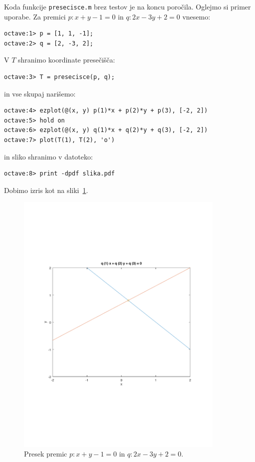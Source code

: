 \documentclass[A4]{article}
\begin{document}
Koda funkcije {\tt presecisce.m} brez testov je na koncu poročila.
Oglejmo si primer uporabe. Za premici $p : x + y - 1 = 0$ in $q : 2x - 3y + 2 = 0$ vnesemo:
\begin{lstlisting}
octave:1> p = [1, 1, -1];
octave:2> q = [2, -3, 2];
\end{lstlisting}
V $T$ shranimo koordinate presečišča:
\begin{lstlisting}
octave:3> T = presecisce(p, q);
\end{lstlisting}
in vse skupaj narišemo:
\begin{lstlisting}
octave:4> ezplot(@(x, y) p(1)*x + p(2)*y + p(3), [-2, 2])
octave:5> hold on 
octave:6> ezplot(@(x, y) q(1)*x + q(2)*y + q(3), [-2, 2])
octave:7> plot(T(1), T(2), 'o')
\end{lstlisting}
in sliko shranimo v datoteko:
\begin{lstlisting}
octave:8> print -dpdf slika.pdf  
\end{lstlisting}
Dobimo izris kot na sliki~\ref{slika:presek_premic}.
\begin{figure}
	\centering
	\includegraphics[width=10cm]{slika.pdf}
	\caption{Presek premic $p : x + y - 1 = 0$ in $q : 2x - 3y + 2 = 0$.}
	\label{slika:presek_premic}
\end{figure}

\end{document}
